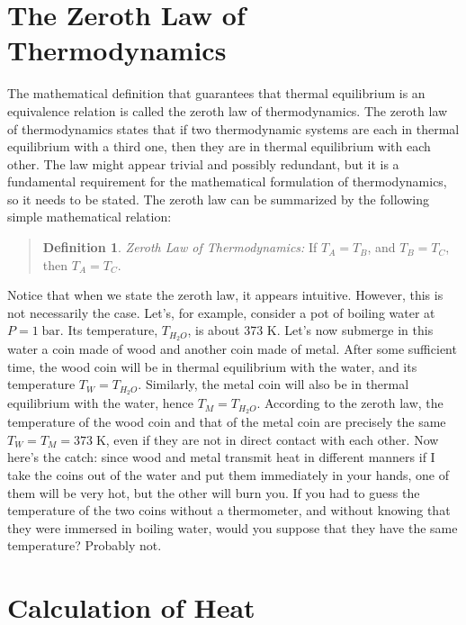 \documentclass[
  9pt,
]{extbook}
\theoremstyle{definition}
\newtheorem{definition}{Definition}[chapter]
\theoremstyle{definition}
\theoremstyle{definition}
\theoremstyle{remark}
\begin{document}
\hypertarget{the-zeroth-law-of-thermodynamics}{%
\section{The Zeroth Law of Thermodynamics}\label{the-zeroth-law-of-thermodynamics}}

The mathematical definition that guarantees that thermal equilibrium is an equivalence relation is called the zeroth law of thermodynamics. The zeroth law of thermodynamics states that if two thermodynamic systems are each in thermal equilibrium with a third one, then they are in thermal equilibrium with each other. The law might appear trivial and possibly redundant, but it is a fundamental requirement for the mathematical formulation of thermodynamics, so it needs to be stated. The zeroth law can be summarized by the following simple mathematical relation:

\begin{quote}
\begin{definition}
\protect\hypertarget{def:zerothlaw}{}{\label{def:zerothlaw} }\emph{Zeroth Law of Thermodynamics:} If \(T_A = T_B\), and \(T_B = T_C\), then \(T_A = T_C\).
\end{definition}
\end{quote}

Notice that when we state the zeroth law, it appears intuitive. However, this is not necessarily the case. Let's, for example, consider a pot of boiling water at \(P=1\;\mathrm{bar}\). Its temperature, \(T_{H_2O}\), is about 373 K. Let's now submerge in this water a coin made of wood and another coin made of metal. After some sufficient time, the wood coin will be in thermal equilibrium with the water, and its temperature \(T_W = T_{H_2O}\). Similarly, the metal coin will also be in thermal equilibrium with the water, hence \(T_M = T_{H_2O}\). According to the zeroth law, the temperature of the wood coin and that of the metal coin are precisely the same \(T_W = T_M = 373\;\mathrm{K}\), even if they are not in direct contact with each other. Now here's the catch: since wood and metal transmit heat in different manners if I take the coins out of the water and put them immediately in your hands, one of them will be very hot, but the other will burn you. If you had to guess the temperature of the two coins without a thermometer, and without knowing that they were immersed in boiling water, would you suppose that they have the same temperature? Probably not.

\hypertarget{heatint}{%
\section{Calculation of Heat}\label{heatint}}
\end{document}
